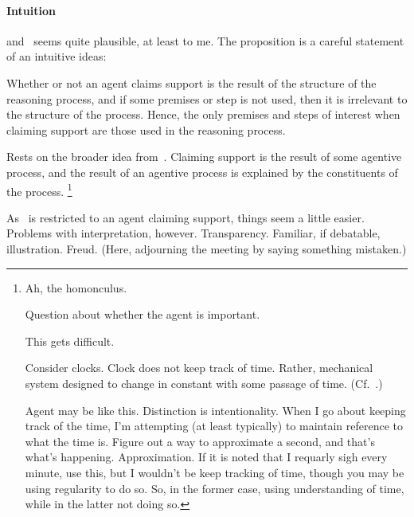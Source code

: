 \paragraph{Intuition}

\begin{note}[Intuition]
  \ESU{} and~\gESU{} seems quite plausible, at least to me.
  The proposition is a careful statement of an intuitive ideas:

  Whether or not an agent claims support is the result of the structure of the reasoning process, and if some premises or step is not used, then it is irrelevant to the structure of the process.
  Hence, the only premises and steps of interest when claiming support are those used in the reasoning process.

  Rests on the broader idea from~\gESU{}.
  Claiming support is the result of some agentive process, and the result of an agentive process is explained by the constituents of the process.\nolinebreak
  \footnote{
    Ah, the homonculus.

    Question about whether the agent is important.

    This gets difficult.

    Consider clocks.
    Clock does not keep track of time.
    Rather, mechanical system designed to change in constant with some passage of time. (Cf.\ \textcite{Smith:1988aa}.)

    Agent may be like this.
    Distinction is intentionality.
    When I go about keeping track of the time, I'm attempting (at least typically) to maintain reference to what the time is.
    Figure out a way to approximate a second, and that's what's happening.
    Approximation.
    If it is noted that I requarly sigh every minute, use this, but I wouldn't be keep tracking of time, though you may be using regularity to do so.
    So, in the former case, using understanding of time, while in the latter not doing so.
  }

  As~\gESU{} is restricted to an agent claiming support, things seem a little easier.
  Problems with interpretation, however.
  Transparency.
  Familiar, if debatable, illustration.
  Freud.
  (Here, adjourning the meeting by saying something mistaken.)
\end{note}

